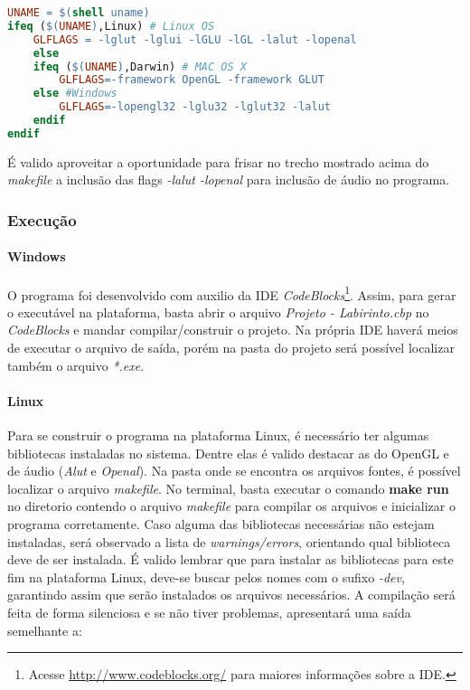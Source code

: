 \begin{lstlisting}[language=make,title=\textit{Makefile},firstnumber=8,numbers=none]
UNAME = $(shell uname)
ifeq ($(UNAME),Linux) # Linux OS
	GLFLAGS = -lglut -lglui -lGLU -lGL -lalut -lopenal
	else
	ifeq ($(UNAME),Darwin) # MAC OS X
		GLFLAGS=-framework OpenGL -framework GLUT
	else #Windows
		GLFLAGS=-lopengl32 -lglu32 -lglut32 -lalut
	endif
endif
\end{lstlisting}

É valido aproveitar a oportunidade para frisar no trecho mostrado acima do \textit{makefile} a inclusão das flags \textit{-lalut -lopenal} para inclusão de áudio no programa.

\subsubsection{Execução}\label{exe}

\paragraph{\textbf{Windows}}

O programa foi desenvolvido com auxilio da IDE \textit{CodeBlocks}\footnote{Acesse \url{http://www.codeblocks.org/} para maiores informações sobre a IDE.}. Assim, para gerar o executável na plataforma, basta abrir o arquivo \textit{Projeto - Labirinto.cbp} no \textit{CodeBlocks} e mandar compilar/construir o projeto. Na própria IDE haverá meios de executar o arquivo de saída, porém na pasta do projeto será possível localizar também o arquivo \textit{*.exe}.

\paragraph{\textbf{Linux}}

Para se construir o programa na plataforma Linux, é necessário ter algumas bibliotecas instaladas no sistema. Dentre elas é valido destacar as do OpenGL e de áudio (\textit{Alut} e \textit{Openal}). Na pasta onde se encontra os arquivos fontes, é possível localizar o arquivo \textit{makefile}. No terminal, basta executar o comando \textbf{make run} no diretorio contendo o arquivo \textit{makefile} para compilar os arquivos e inicializar o programa corretamente. Caso alguma das bibliotecas necessárias não estejam instaladas, será observado a lista de \textit{warnings/errors}, orientando qual biblioteca deve de ser instalada. É valido lembrar que para instalar as bibliotecas para este fim na plataforma Linux, deve-se buscar pelos nomes com o sufixo \textit{-dev}, garantindo assim que serão instalados os arquivos necessários. A compilação será feita de forma silenciosa e se não tiver problemas, apresentará uma saída semelhante a:

